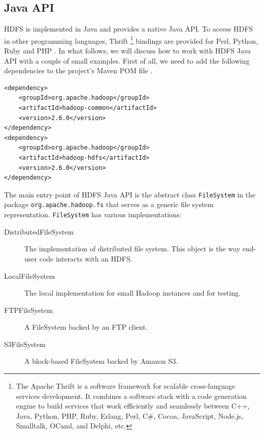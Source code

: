 \documentclass[12pt]{book}
\begin{document}
\subsection{Java API}
HDFS is implemented in Java and provides a native Java API. To access HDFS in other programming languages, Thrift \footnote{The Apache Thrift \cite{Thrift} is a software framework for scalable cross-language services development. It combines a software stack with a code generation engine to build services that work efficiently and seamlessly between C++, Java, Python, PHP, Ruby, Erlang, Perl, C\#, Cocoa, JavaScript, Node.js, Smalltalk, OCaml, and Delphi, etc.} bindings are provided for Perl, Python, Ruby and PHP \cite{HdfsThrift}. In what follows, we will discuss how to work with HDFS Java API with a couple of small examples. First of all, we need to add the following dependencies to the project's Maven POM file \cite{Maven}.
\begin{lstlisting}
<dependency>
    <groupId>org.apache.hadoop</groupId>
    <artifactId>hadoop-common</artifactId>
    <version>2.6.0</version>
</dependency>
<dependency>
	<groupId>org.apache.hadoop</groupId>
	<artifactId>hadoop-hdfs</artifactId>
	<version>2.6.0</version>
</dependency>
\end{lstlisting}

The main entry point of HDFS Java API is the abstract class \texttt{FileSystem} in the package \texttt{org.apache.hadoop.fs} that serves as a generic file system representation. \texttt{FileSystem} has various implementations:
\begin{description}
\item[DistributedFileSystem] The implementation of distributed file system. This object is the way end-user code interacts with an HDFS.
\item[LocalFileSystem] The local implementation for small Hadoop instances and for testing.
\item[FTPFileSystem] A FileSystem backed by an FTP client.
\item[S3FileSystem] A block-based FileSystem backed by Amazon S3.
\end{description}
\end{document}
